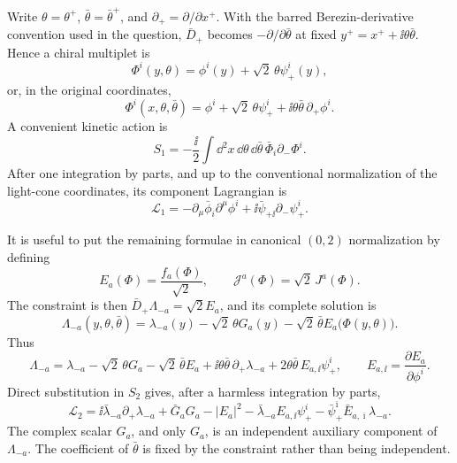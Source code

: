 
\begin{enumerate}
  Write \(\theta=\theta^+\), \(\bar\theta=\bar\theta^+\), and
  \(\partial_+=\partial/\partial x^+\).  With the barred Berezin-derivative
  convention used in the question, \(\bar D_+\) becomes
  \(-\partial/\partial\bar\theta\) at fixed
  \(y^+=x^++\ii\theta\bar\theta\).  Hence a chiral multiplet is
  \[
    \Phi^i(y,\theta)=\phi^i(y)+\sqrt2\,\theta\psi_+^i(y),
  \]
  or, in the original coordinates,
  \[
    \Phi^i(x,\theta,\bar\theta)
      =\phi^i+\sqrt2\,\theta\psi_+^i
       +\ii\theta\bar\theta\,\partial_+\phi^i.
  \]
  A convenient kinetic action is
  \[
    S_1=-\frac{\ii}{2}\int \dd^2x\,\dd\theta\,\dd\bar\theta\,
       \bar\Phi_i\partial_-\Phi^i .
  \]
  After one integration by parts, and up to the conventional normalization
  of the light-cone coordinates, its component Lagrangian is
  \[
    \mathcal L_1
      =-\partial_\mu\bar\phi_i\partial^\mu\phi^i
       +\ii\bar\psi_{+\ii}\partial_-\psi_+^i.
  \]

  It is useful to put the remaining formulae in canonical \((0,2)\)
  normalization by defining
  \[
    E_a(\Phi)=\frac{f_a(\Phi)}{\sqrt2},
    \qquad \mathcal J^a(\Phi)=\sqrt2\,J^a(\Phi).
  \]
  The constraint is then \(\bar D_+\Lambda_{-a}=\sqrt2 E_a\), and its
  complete solution is
  \[
    \Lambda_{-a}(y,\theta,\bar\theta)
      =\lambda_{-a}(y)-\sqrt2\,\theta G_a(y)
       -\sqrt2\,\bar\theta E_a\bigl(\Phi(y,\theta)\bigr).
  \]
  Thus
  \[
    \Lambda_{-a}
      =\lambda_{-a}-\sqrt2\,\theta G_a-\sqrt2\,\bar\theta E_a
       +\ii\theta\bar\theta\,\partial_+\lambda_{-a}
       +2\theta\bar\theta\,E_{a,\ii}\psi_+^i,
    \qquad E_{a,\ii}=\frac{\partial E_a}{\partial\phi^i}.
  \]
  Direct substitution in \(S_2\) gives, after a harmless integration by
  parts,
  \[
    \mathcal L_2
      =\ii\bar\lambda_{-a}\partial_+\lambda_{-a}
       +\bar G_aG_a-|E_a|^2
       -\bar\lambda_{-a}E_{a,\ii}\psi_+^i
       -\bar\psi_+^{\bar\imath}\bar E_{a,\bar\imath}\lambda_{-a}.
  \]
  The complex scalar \(G_a\), and only \(G_a\), is an independent auxiliary
  component of \(\Lambda_{-a}\).  The coefficient of \(\bar\theta\) is fixed
  by the constraint rather than being independent.


\end{enumerate}
